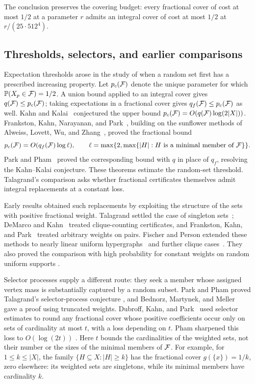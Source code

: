 The conclusion preserves the covering budget: every fractional cover of
cost at most $1/2$ at a parameter $r$ admits an integral cover of cost at
most $1/2$ at $r/(25\cdot512^4)$.

\subsection{Thresholds, selectors, and earlier comparisons}

Expectation thresholds arose in the study of when a random set first
has a prescribed increasing property. Let $p_c(\mathcal F)$ denote the unique
parameter for which $\mathbb P(X_p\in\mathcal F)=1/2$. A union bound applied to
an integral cover gives $q(\mathcal F)\le p_c(\mathcal F)$; taking expectations in a
fractional cover gives $q_f(\mathcal F)\le p_c(\mathcal F)$ as well.
Kahn and Kalai~\cite{KahnKalai2007} conjectured the upper bound
$p_c(\mathcal F)=O(q(\mathcal F)\log(2|X|))$.
Frankston, Kahn, Narayanan, and Park~\cite{FKNP2021}, building on the
sunflower methods of Alweiss, Lovett, Wu, and Zhang~\cite{ALWZ2021},
proved the fractional bound
\[
 p_c(\mathcal F)=O(q_f(\mathcal F)\log\ell),
 \qquad
 \ell=\max\{2,\max\{|H|:H\text{ is a minimal member of }\mathcal F\}\}.
\]
Park and Pham~\cite{ParkPham2024threshold} proved the corresponding
bound with $q$ in place of $q_f$, resolving the Kahn--Kalai conjecture.
These theorems estimate the random-set threshold. Talagrand's comparison
asks whether fractional certificates themselves admit integral
replacements at a constant loss.

Early results obtained such replacements by exploiting the structure
of the sets with positive fractional weight. Talagrand settled the case
of singleton sets~\cite[Section~6]{Talagrand2010}; DeMarco and
Kahn~\cite{DeMarcoKahn2015} treated clique-counting certificates, and
Frankston, Kahn, and Park~\cite{FrankstonKahnPark2022} treated arbitrary
weights on pairs. Fischer and Person extended these methods to nearly
linear uniform hypergraphs~\cite{FischerPerson2025} and further clique
cases~\cite{FischerPerson2025further}. They also proved the comparison
with high probability for constant weights on random uniform supports
\cite{FischerPerson2026random}.

Selector processes supply a different route: they seek a member whose
assigned vertex mass is substantially captured by a random subset.
Park and Pham proved Talagrand's selector-process conjecture
\cite{ParkPham2024selector}, and Bednorz, Martynek, and
Meller~\cite{BMM2022} gave a proof using truncated weights.
Dubroff, Kahn, and Park~\cite[Theorem~1.2]{DKP2024} used selector
estimates to round any fractional cover whose positive coefficients
occur only on sets of cardinality at most $t$, with a loss depending on
$t$. Pham sharpened this loss to $O(\log(2t))$
\cite[arXiv version~1, Theorem~1.2]{Pham2024}.
Here $t$ bounds the cardinalities of the weighted sets, not their number
or the sizes of the minimal members of $\mathcal F$. For example, for
$1\le k\le|X|$, the family $\{H\subseteq X:|H|\ge k\}$ has the
fractional cover $g(\{x\})=1/k$, zero elsewhere: its weighted sets are
singletons, while its minimal members have cardinality $k$.

